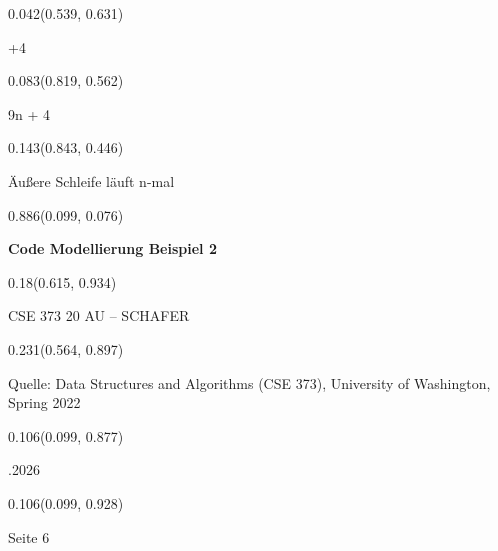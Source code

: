 \documentclass[aspectratio=169]{beamer}
\begin{document}
\begin{frame}[fragile]
\begin{textblock}{0.042}(0.539, 0.631)
  \begin{minipage}[t][0.044\paperheight]{\linewidth}
    +4
  \end{minipage}
\end{textblock}

\begin{textblock}{0.083}(0.819, 0.562)
  \begin{minipage}[t][0.044\paperheight]{\linewidth}
    9n + 4
  \end{minipage}
\end{textblock}

\begin{textblock}{0.143}(0.843, 0.446)
  \begin{minipage}[t][0.094\paperheight]{\linewidth}
    Äußere Schleife läuft n-mal
  \end{minipage}
\end{textblock}

\begin{textblock}{0.886}(0.099, 0.076)
  \begin{minipage}[t][0.131\paperheight]{\linewidth}
    \textbf{Code Modellierung  Beispiel 2}
  \end{minipage}
\end{textblock}

\begin{textblock}{0.18}(0.615, 0.934)
  \begin{minipage}[b][0.032\paperheight]{\linewidth}
    \raggedright
    \fontsize{3}{3.3}\selectfont CSE 373 20 AU – SCHAFER
  \end{minipage}
\end{textblock}

\begin{textblock}{0.231}(0.564, 0.897)
  \begin{minipage}[b][0.032\paperheight]{\linewidth}
    \raggedright
    \fontsize{3}{3.3}\selectfont Quelle: Data Structures and Algorithms (CSE 373), University of Washington, Spring 2022
  \end{minipage}
\end{textblock}

\begin{textblock}{0.106}(0.099, 0.877)
  \begin{minipage}[b][0.026\paperheight]{\linewidth}
    \raggedright
    \fontsize{3}{3.3}.2026
  \end{minipage}
\end{textblock}

\begin{textblock}{0.106}(0.099, 0.928)
  \begin{minipage}[b][0.031\paperheight]{\linewidth}
    \raggedright
    \fontsize{3}{3.3}\selectfont Seite 6
  \end{minipage}
\end{textblock}
\end{frame}
\end{document}
